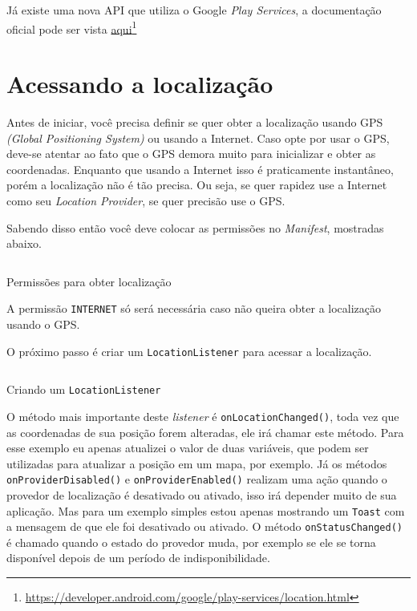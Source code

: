 \documentclass[a4paper,12pt,brazil,oneside]{book}
\begin{document}
		Já existe uma nova API que utiliza o Google \emph{Play Services}, a documentação oficial pode ser vista \href{https://developer.android.com/google/play-services/location.html}{aqui}\footnote{\href{https://developer.android.com/google/play-services/location.html}{https://developer.android.com/google/play-services/location.html}}

		\section{Acessando a localização}
	
		Antes de iniciar, você precisa definir se quer obter a localização usando GPS \emph{(Global Positioning System)} ou usando a Internet. Caso opte por usar o GPS, deve-se atentar ao fato que o GPS demora muito para inicializar e obter as coordenadas. Enquanto que usando a Internet isso é praticamente instantâneo, porém a localização não é tão precisa. Ou seja, se quer rapidez use a Internet como seu \emph{Location Provider}, se quer precisão use o GPS.

		Sabendo disso então você deve colocar as permissões no \emph{Manifest}, mostradas abaixo.

		\begin{listing}[H]
		\inputminted[linenos=true,fontsize=\small,frame=lines, framesep=2mm, tabsize=2,numbersep=5pt]{xml}{src/api/maps/perm1.xml}
		\caption{Permissões para obter localização}
		\label{code:locationperm}
		\end{listing} 		

		A permissão \texttt{INTERNET} só será necessária caso não queira obter a localização usando o GPS.

		O próximo passo é criar um \texttt{LocationListener} para acessar a localização.

		\begin{listing}[H]
		\inputminted[linenos=true,fontsize=\small,frame=lines, framesep=2mm, tabsize=2,numbersep=5pt]{java}{src/api/maps/listener.java}
		\caption{Criando um \texttt{LocationListener}}
		\label{code:locationlistener}
		\end{listing} 	

		O método mais importante deste \emph{listener} é \texttt{onLocationChanged()}, toda vez que as coordenadas de sua posição forem alteradas, ele irá chamar este método. Para esse exemplo eu apenas atualizei o valor de duas variáveis, que podem ser utilizadas para atualizar a posição em um mapa, por exemplo. Já os métodos \texttt{onProviderDisabled()} e \texttt{onProviderEnabled()} realizam uma ação quando o provedor de localização é desativado ou ativado, isso irá depender muito de sua aplicação. Mas para um exemplo simples estou apenas mostrando um \texttt{Toast} com a mensagem de que ele foi desativado ou ativado. O método \texttt{onStatusChanged()} é chamado quando o estado do provedor muda, por exemplo se ele se torna disponível depois de um período de indisponibilidade.
\end{document}
